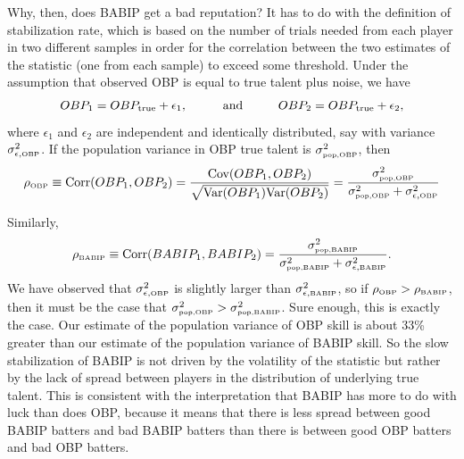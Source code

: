 \documentclass[11pt]{article}
\begin{document}
Why, then, does BABIP get a bad reputation? It has to do with the definition
of stabilization rate, which is based on the number of trials needed from each
player in two different samples in order for the correlation between the two
estimates of the statistic (one from each sample) to exceed some threshold.
Under the assumption that observed OBP is equal to true talent plus noise,
we have
$$OBP_1 = OBP_{\mbox{\scriptsize true}} + \epsilon_1,\hspace{1cm}\mbox{and}
\hspace{1cm} OBP_2 = OBP_{\mbox{\scriptsize true}} + \epsilon_2,$$
where $\epsilon_1$ and $\epsilon_2$ are independent and identically
distributed, say with variance $\sigma^2_{\epsilon, \mbox{\tiny OBP}}$.
If the population variance in OBP true talent is
$\sigma^2_{\mbox{\tiny pop,OBP}}$, then
$$\rho_{\mbox{\tiny OBP}} \equiv \mbox{Corr}(OBP_1, OBP_2) =
    \frac{\mbox{Cov}(OBP_1, OBP_2)}
    {\sqrt{\mbox{Var}(OBP_1)\mbox{Var}(OBP_2)}} =
    \frac{\sigma^2_{\mbox{\tiny pop,OBP}}}
    {\sigma^2_{\mbox{\tiny pop,OBP}} + \sigma^2_{\epsilon,\mbox{\tiny OBP}}}$$

Similarly,
$$\rho_{\mbox{\tiny BABIP}} \equiv \mbox{Corr}(BABIP_1, BABIP_2) =
\frac{\sigma^2_{\mbox{\tiny pop,BABIP}}}
{\sigma^2_{\mbox{\tiny pop,BABIP}} + \sigma^2_{\epsilon,\mbox{\tiny BABIP}}}.$$
We have observed that
$\sigma^2_{\epsilon,\mbox{\tiny OBP}}$ is slightly larger than
$\sigma^2_{\epsilon,\mbox{\tiny BABIP}}$, so if
$\rho_{\mbox{\tiny OBP}} > \rho_{\mbox{\tiny BABIP}}$, then it must be
the case that $\sigma^2_{\mbox{\tiny pop,OBP}} >
\sigma^2_{\mbox{\tiny pop,BABIP}}$. Sure enough, this is exactly the case. Our
estimate of the population variance of OBP skill is about 33\% greater than our
estimate of the population variance of BABIP skill. So the slow stabilization
of BABIP is not driven by the volatility of the statistic but rather by the
lack of spread between players in the distribution of underlying true talent.
This is consistent
with the interpretation that BABIP has more to do with luck than does OBP,
because it means that there is less spread between good BABIP batters and bad
BABIP batters than there is between good OBP batters and bad OBP batters.
\end{document}

